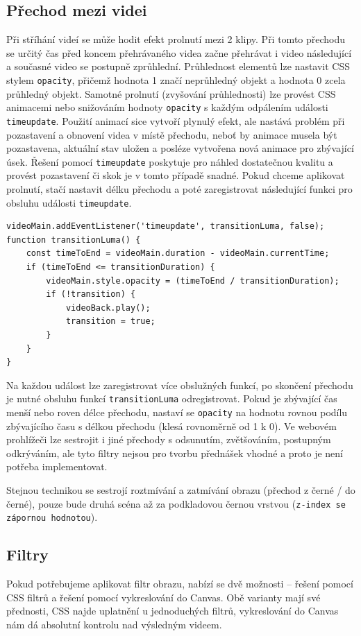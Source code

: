 \subsection{Přechod mezi videi}
Při stříhání videí se může hodit efekt prolnutí mezi 2 klipy. Při tomto přechodu se určitý čas před koncem přehrávaného videa začne přehrávat i video následující a současné video se postupně zprůhlední. Průhlednost elementů lze nastavit CSS stylem \texttt{opacity}, přičemž hodnota 1 značí neprůhledný objekt a hodnota 0 zcela průhledný objekt. Samotné prolnutí (zvyšování průhlednosti) lze provést CSS animacemi nebo snižováním hodnoty \texttt{opacity} s každým odpálením události \texttt{timeupdate}. Použití animací sice vytvoří plynulý efekt, ale nastává problém při pozastavení a obnovení videa v místě přechodu, neboť by animace musela být pozastavena, aktuální stav uložen a posléze vytvořena nová animace pro zbývající úsek. Řešení pomocí \texttt{timeupdate} poskytuje pro náhled dostatečnou kvalitu a provést pozastavení či skok je v tomto případě snadné. Pokud chceme aplikovat prolnutí, stačí nastavit délku přechodu a poté zaregistrovat následující funkci pro obsluhu události \texttt{timeupdate}.
\begin{lstlisting}[style=JavaScript]
videoMain.addEventListener('timeupdate', transitionLuma, false);
function transitionLuma() {
    const timeToEnd = videoMain.duration - videoMain.currentTime;
    if (timeToEnd <= transitionDuration) {
        videoMain.style.opacity = (timeToEnd / transitionDuration);
        if (!transition) {
            videoBack.play();
            transition = true;
        }
    }
}
\end{lstlisting}
Na každou událost lze zaregistrovat více obslužných funkcí, po skončení přechodu je nutné obsluhu funkcí \texttt{transitionLuma} odregistrovat. Pokud je zbývající čas menší nebo roven délce přechodu, nastaví se \texttt{opacity} na hodnotu rovnou podílu zbývajícího času s délkou přechodu (klesá rovnoměrně od 1 k 0). Ve webovém prohlížeči lze sestrojit i jiné přechody s odsunutím, zvětšováním, postupným odkrýváním, ale tyto filtry nejsou pro tvorbu přednášek vhodné a proto je není potřeba implementovat.

Stejnou technikou se sestrojí roztmívání a zatmívání obrazu (přechod z černé / do černé), pouze bude druhá scéna až za podkladovou černou vrstvou (\texttt{z-index se zápornou hodnotou}).

\subsection{Filtry}
Pokud potřebujeme aplikovat filtr obrazu, nabízí se dvě možnosti -- řešení pomocí CSS filtrů a řešení pomocí vykreslování do Canvas. Obě varianty mají své přednosti, CSS najde uplatnění u jednoduchých filtrů, vykreslování do Canvas nám dá absolutní kontrolu nad výsledným videem.

